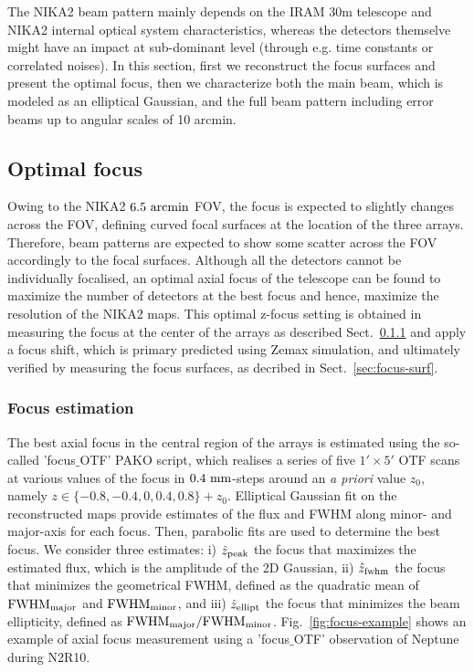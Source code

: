 

The NIKA2 beam pattern mainly depends on the IRAM 30m telescope and NIKA2 internal optical system characteristics, whereas the detectors themselve might have an impact at sub-dominant level (through e.g. time constants or correlated noises). In this section, first we reconstruct the focus surfaces and present the optimal focus, then we characterize both the main beam, which is modeled as an elliptical Gaussian, and the full beam pattern including error beams up to angular scales of 10 arcmin. 

\subsection{Optimal focus}
\label{sec:focus}

Owing to the NIKA2 $6.5~\rm{arcmin}$ FOV, the focus is expected to
slightly changes across the FOV, defining curved focal surfaces at the
location of the three arrays. Therefore, beam patterns are expected to
show some scatter across the FOV accordingly to the focal
surfaces. Although all the detectors cannot be individually focalised,
an optimal axial focus of the telescope can be found to maximize the
number of detectors at the best focus and hence, maximize the
resolution of the NIKA2 maps. This optimal z-focus setting is obtained
in measuring the focus at the center of the arrays as described
Sect.~\ref{sec:focus-meas} and apply a focus shift, which is primary
predicted using Zemax simulation, and ultimately verified by measuring
the focus surfaces, as decribed in Sect.~\ref{sec:focus-surf}.


\subsubsection{Focus estimation}
\label{sec:focus-meas}

The best axial focus in the central region of the arrays is estimated
using the so-called 'focus$\_$OTF' PAKO script, which realises a
series of five $1' \times 5'$ OTF scans at various values of
the focus in $0.4~\rm{mm}$-steps around an \emph{a priori} value $z_0$,
namely $z \in \{-0.8, -0.4, 0, 0.4, 0.8\} + z_0$. Elliptical Gaussian
fit on the reconstructed maps provide estimates of the flux and FWHM
along minor- and major-axis for each focus. Then, parabolic fits are
used to determine the best focus. We consider three estimates: i)
$\hat z_{\rm{peak}}$ the focus that maximizes the estimated flux,
which is the amplitude of the 2D Gaussian, 
ii) $\hat z_{\rm{fwhm}}$ the focus that
minimizes the geometrical FWHM, defined as the quadratic mean of
$\rm{FWHM}_{\rm{major}}$ and $\rm{FWHM}_{\rm{minor}}$,  and iii)
$\hat z_{\rm{ellipt}}$ the focus that minimizes the beam ellipticity,
defined as $\rm{FWHM}_{\rm{major}}/\rm{FWHM}_{\rm{minor}}$.
Fig.~\ref{fig:focus-example} shows an example of
axial focus measurement using a 'focus$\_$OTF' observation of Neptune
during N2R10.

